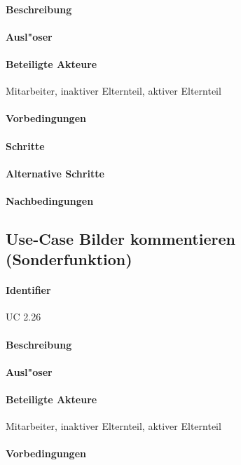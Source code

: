   \paragraph{Beschreibung}
  \paragraph{Ausl"oser}
  \paragraph{Beteiligte Akteure}   \leavevmode \newline
    Mitarbeiter, inaktiver Elternteil, aktiver Elternteil
  \paragraph{Vorbedingungen}
  \paragraph{Schritte}
  \paragraph{Alternative Schritte}
  \paragraph{Nachbedingungen}

  
  \newpage
 \subsection{Use-Case Bilder kommentieren (Sonderfunktion)}
  \paragraph{Identifier}
  UC 2.26
  \paragraph{Beschreibung}
  \paragraph{Ausl"oser}
  \paragraph{Beteiligte Akteure}   \leavevmode \newline
    Mitarbeiter, inaktiver Elternteil, aktiver Elternteil
  \paragraph{Vorbedingungen}
